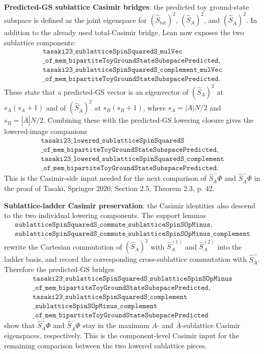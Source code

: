 \documentclass[a4paper,11pt]{article}
\begin{document}
\textbf{Predicted-GS sublattice Casimir bridges}: the predicted toy
ground-state subspace is defined as the joint eigenspace for
\((\hat S_{\mathrm{tot}})^2\), \((\hat S_A)^2\), and
\((\hat S_{\bar A})^2\).  In addition to the already used total-Casimir
bridge, Lean now exposes the two sublattice components:
\[
\begin{gathered}
\texttt{tasaki23\_sublatticeSpinSquaredS\_mulVec}\\
\texttt{\_of\_mem\_bipartiteToyGroundStateSubspacePredicted},\\
\texttt{tasaki23\_sublatticeSpinSquaredS\_complement\_mulVec}\\
\texttt{\_of\_mem\_bipartiteToyGroundStateSubspacePredicted}.
\end{gathered}
\]
These state that a predicted-GS vector is an eigenvector of
\((\hat S_A)^2\) at \(s_A(s_A+1)\) and of
\((\hat S_{\bar A})^2\) at \(s_B(s_B+1)\), where
\(s_A=|A|N/2\) and \(s_B=|\bar A|N/2\).  Combining these with the
predicted-GS lowering closure gives the lowered-image companions
\[
\begin{gathered}
\texttt{tasaki23\_lowered\_sublatticeSpinSquaredS}\\
\texttt{\_of\_mem\_bipartiteToyGroundStateSubspacePredicted},\\
\texttt{tasaki23\_lowered\_sublatticeSpinSquaredS\_complement}\\
\texttt{\_of\_mem\_bipartiteToyGroundStateSubspacePredicted}.
\end{gathered}
\]
This is the Casimir-side input needed for the next comparison of
\(\hat S_A^- \Phi\) and \(\hat S_{\bar A}^- \Phi\) in the proof of
Tasaki, Springer 2020, Section 2.5, Theorem 2.3, p. 42.

\textbf{Sublattice-ladder Casimir preservation}: the Casimir identities
also descend to the two individual lowering components.  The support
lemmas
\[
\begin{gathered}
\texttt{sublatticeSpinSquaredS\_commute\_sublatticeSpinSOpMinus},\\
\texttt{sublatticeSpinSquaredS\_commute\_sublatticeSpinSOpMinus\_complement}
\end{gathered}
\]
rewrite the Cartesian commutation of \((\hat S_A)^2\) with
\(\hat S_A^{(1)}\) and \(\hat S_A^{(2)}\) into the ladder basis, and record
the corresponding cross-sublattice commutation with
\(\hat S_{\bar A}^-\).  Therefore the predicted-GS bridges
\[
\begin{gathered}
\texttt{tasaki23\_sublatticeSpinSquaredS\_sublatticeSpinSOpMinus}\\
\texttt{\_of\_mem\_bipartiteToyGroundStateSubspacePredicted},\\
\texttt{tasaki23\_sublatticeSpinSquaredS\_complement}\\
\texttt{\_sublatticeSpinSOpMinus\_complement}\\
\texttt{\_of\_mem\_bipartiteToyGroundStateSubspacePredicted}
\end{gathered}
\]
show that \(\hat S_A^-\Phi\) and \(\hat S_{\bar A}^-\Phi\) stay in the
maximum \(A\)- and \(\bar A\)-sublattice Casimir eigenspaces,
respectively.  This is the component-level Casimir input for the
remaining comparison between the two lowered sublattice pieces.
\end{document}
